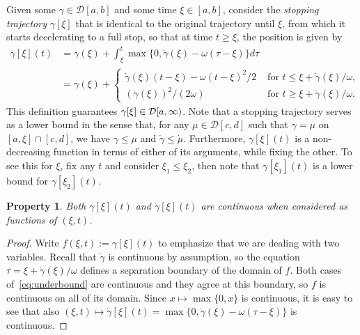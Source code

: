 \documentclass[a4paper]{article}
\theoremstyle{definition}
\theoremstyle{plain}
\newtheorem{property}{Property\hspace{0.25em}\ignorespaces}
\begin{document}
Given some $\gamma \in \mathcal{D}[a,b]$ and some time $\xi \in [a, b]$, consider the
\emph{stopping trajectory} $\gamma[\xi]$ that is identical to the original trajectory
until $\xi$, from which it starts decelerating to a full stop, so that at time
$t \geq \xi$, the position is given by
\begin{subequations}
\begin{align}
  \gamma[\xi](t) &= \gamma(\xi) + \int_{\xi}^{t} \max\{0, \dot{\gamma}(\xi) - \omega(\tau-\xi) \} d\tau \\
                     &= \gamma(\xi) + \begin{cases}
                                        \dot{\gamma}(\xi)(t-\xi) - \omega(t-\xi)^{2} / 2 &\text{ for } t \leq \xi + \dot{\gamma}(\xi) / \omega , \\
                                        {(\dot{\gamma}(\xi))}^{2} / (2 \omega) &\text{ for } t \geq \xi + \dot{\gamma}(\xi) / \omega .
                                        \end{cases} \label{eq:underbound}
\end{align}
\end{subequations}
This definition guarantees $\gamma[\xi] \in \mathcal{D}[a,\infty)$.
%
Note that a stopping trajectory serves as a lower bound in the sense that, for any
$\mu\in\mathcal{D}[c,d]$ such that $\gamma = \mu$ on $[a, \xi] \cap [c, d]$, we
have $\gamma \leq \mu$ and $\dot{\gamma} \leq \dot{\mu}$.
%
Furthermore, $\gamma[\xi](t)$ is a non-decreasing function in terms of either of its
arguments, while fixing the other. To see this for $\xi$, fix any $t$ and
consider $\xi_{1} \leq \xi_{2}$, then note that $\gamma[\xi_{1}](t)$ is a lower
bound for $\gamma[\xi_{2}](t)$.
%
\begin{property}
  Both $\gamma[\xi](t)$ and $\dot{\gamma}[\xi](t)$ are continuous when considered as functions
  of $(\xi, t)$.
\end{property}
\begin{proof}
  Write $f(\xi, t) := \gamma[\xi](t)$ to emphasize that we are dealing with two variables.
  Recall that $\dot{\gamma}$ is continuous by assumption, so the equation
  $\tau = \xi + \dot{\gamma}(\xi)/\omega$ defines a separation boundary of the
  domain of $f$. Both cases of~\eqref{eq:underbound} are continuous and they
  agree at this boundary, so $f$ is continuous on all of its domain.
  Since $x \mapsto \max\{0, x \}$ is continuous, it is easy to see that also
  $(\xi, t) \mapsto \dot{\gamma}[\xi](t) = \max\{0, \dot{\gamma}(\xi) - \omega (\tau - \xi) \}$
  is continuous.
\end{proof}
\end{document}
